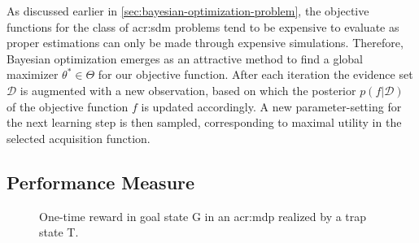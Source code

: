 As discussed earlier in  \autoref{sec:bayesian-optimization-problem}, the objective functions for the class of \acrshort{acr:sdm} problems tend to be expensive to evaluate as proper estimations can only be made through expensive simulations.
Therefore, Bayesian optimization emerges as an attractive method to find a global maximizer $\theta^\ast \in \Theta$ for our objective function.
After each iteration the evidence set $\mathcal{D}$ is augmented with a new observation, based on which the posterior $p(f\vert \mathcal{D})$ of the objective function $f$ is updated accordingly.
A new parameter-setting for the next learning step is then sampled, corresponding to maximal utility in the selected acquisition function.


\subsection{Performance Measure}
\label{sec:performance-measure}

\begin{figure}[t!]
\centering
{}
\caption{One-time reward in goal state G in an \acrshort{acr:mdp} realized by a trap state T.}
\label{fig:goal-trap-state}
\end{figure}


